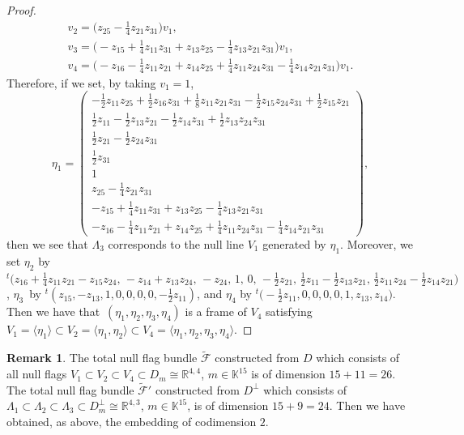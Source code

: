 \documentclass[11pt]{article}
\numberwithin{equation}{section}
\numberwithin{equation}{section}
\theoremstyle{definition}
\newtheorem{Rem}{Remark}[section]
\newcommand{\ber}{\begin{Rem}}
\newcommand{\enr}{
 \stepcounter{Th}\stepcounter{Cor}\stepcounter{Prop}
 \stepcounter{Lem}\stepcounter{Def}\stepcounter{Ex}\end{Rem}}
\newcommand{\R}{\mathbb{R}}
\newcommand{\KK}{\mathbb{K}}
\newcommand{\0}{\boldsymbol{0}}
\begin{document}
\begin{proof}
\begin{gather*}
v_2 = \biggl(z_{25} -\frac{1}{4}z_{21}z_{31}\biggr)v_1,
\\
v_3 = \biggl(- z_{15} + \frac{1}{4}z_{11}z_{31} + z_{13}z_{25} - \frac{1}{4}z_{13}z_{21}z_{31}\biggr)v_1,
\\
v_4 = \biggl(- z_{16} - \frac{1}{4}z_{11}z_{21} + z_{14}z_{25} + \frac{1}{4}z_{11}z_{24}z_{31}
- \frac{1}{4}z_{14}z_{21}z_{31}\biggr)v_1.
\end{gather*}
Therefore, if we set, by taking $v_1 = 1$,
\[
\eta_1 =
\begin{pmatrix}
- \frac{1}{2}z_{11}z_{25} + \frac{1}{2}z_{16}z_{31} + \frac{1}{8}z_{11}z_{21}z_{31}
- \frac{1}{2}z_{15}z_{24}z_{31} + \frac{1}{2}z_{15}z_{21}
\\
\frac{1}{2}z_{11} - \frac{1}{2}z_{13}z_{21} - \frac{1}{2}z_{14}z_{31} + \frac{1}{2}z_{13}z_{24}z_{31}
\\
\frac{1}{2}z_{21} - \frac{1}{2}z_{24}z_{31}
\\
\frac{1}{2}z_{31}
\\
1
\\
z_{25} -\frac{1}{4}z_{21}z_{31}
\\
- z_{15} + \frac{1}{4}z_{11}z_{31} + z_{13}z_{25} - \frac{1}{4}z_{13}z_{21}z_{31}
\\
- z_{16} - \frac{1}{4}z_{11}z_{21} + z_{14}z_{25} + \frac{1}{4}z_{11}z_{24}z_{31} - \frac{1}{4}z_{14}z_{21}z_{31}
\end{pmatrix},
\]
then we see that $\Lambda_3$ corresponds to the null line $V_1$ generated by $\eta_1$.
Moreover, we set $\eta_2$ by
$
{}^t\bigl(z_{16} + \frac{1}{4}z_{11}z_{21} - z_{15}z_{24}, \,- z_{14} + z_{13}z_{24}, \, - z_{24}, \,1, \,0, \,- \frac{1}{2}z_{21}, \,
\frac{1}{2}z_{11} - \frac{1}{2}z_{13}z_{21}, \,\frac{1}{2}z_{11}z_{24} - \frac{1}{2}z_{14}z_{21}\bigr)
$,
$\eta_3$~by ${}^t(z_{15}, - z_{13}, 1, 0, 0, 0, 0, - \frac{1}{2}z_{11})
$, and $\eta_4$ by
$
{}^t\bigl(-\frac{1}{2}z_{11}, 0, 0, 0, 0, 1, z_{13}, z_{14}\bigr)
$.
Then we have that~$(\eta_1, \eta_2, \eta_3, \eta_4)$ is a frame of $V_4$ satisfying
$V_1 = \langle \eta_1\rangle \subset V_2 = \langle \eta_1, \eta_2\rangle \subset V_4 = \langle \eta_1, \eta_2, \eta_3, \eta_4\rangle$.
\end{proof}

\ber
{\rm
The total null flag bundle $\widetilde{\mathcal F}$ constructed from $D$ which consists of all null flags $V_1 \subset V_2 \subset V_4 \subset D_m \cong \R^{4,4}$, $m \in \KK^{15}$
is of dimension $15 + 11 = 26$.
The total null flag bundle $\widetilde{\mathcal F}'$ constructed from $D^\perp$ which consists of $\Lambda_1 \subset
\Lambda_2 \subset \Lambda_3 \subset D^\perp_m \cong \R^{4,3}$, $m \in \KK^{15}$, is of dimension $15+9 = 24$.
Then we have obtained, as above, the embedding  of codimension $2$.
}
\enr
\end{document}
